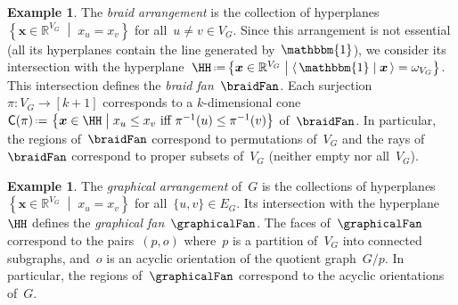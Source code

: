 \documentclass{amsart}
\theoremstyle{definition}
\newtheorem{example}[theorem]{Example}
\newcommand{\R}{\mathbb{R}} %
\renewcommand{\b}[1]{{\boldsymbol{#1}}} %
\newcommand{\set}[2]{\left\{ #1 \;\middle|\; #2 \right\}} %
\newcommand{\bigset}[2]{\big\{ #1 \;\big|\; #2 \big\}} %
\newcommand{\dotprod}[2]{\langle \, #1 \; | \; #2 \, \rangle} %
\newcommand{\one}{\mathbbm{1}} %
\newcommand{\eqdef}{\mbox{\,\raisebox{0.2ex}{\scriptsize\ensuremath{\mathrm:}}\ensuremath{=}\,}} %
\DeclareMathOperator{\cone}{cone} %
\newcommand{\darkblue}{\color{darkblue}} %
\newcommand{\defn}[1]{\textsl{\darkblue #1}} %
\newcommand{\primalCone}{\mathsf{C}^\star} %
\newcommand{\normalCone}{\mathsf{C}} %
\newcommand{\weight}{\omega} %
\begin{document}
\begin{example}
  \label{exm:braidFan}
  The \defn{braid arrangement} is the collection of hyperplanes~$\set{\b{x} \in \R^{V_G}}{x_u = x_v}$ for all~$u \ne v \in V_G$.
  Since this arrangement is not essential (all its hyperplanes contain the line generated by~$\one$), we consider its intersection with the hyperplane~$\HH \eqdef \bigset{\b{x} \in \R^{V_G}}{\dotprod{\one}{\b{x}} = \weight_{V_G}}$.
  This intersection defines the \defn{braid fan}~$\braidFan$.
  Each surjection~$\pi : V_G \to [k+1]$ corresponds to a $k$-dimensional cone~$\normalCone(\pi) \eqdef \set{\b{x} \in \HH}{x_u \le x_v \text{ iff } \pi^{-1}(u) \le \pi^{-1}(v)}$ of~$\braidFan$.
  In particular, the regions of~$\braidFan$ correspond to permutations of~$V_G$ and the rays of~$\braidFan$ correspond to proper subsets of~$V_G$ (neither empty nor all~$V_G$).
\end{example}

\begin{example}
  \label{exm:graphicalFan}
  The \defn{graphical arrangement} of~$G$ is the collections of hyperplanes~$\set{\b{x} \in \R^{V_G}}{x_u = x_v}$ for all~$\{u,v\} \in E_G$.
  Its intersection with the hyperplane~$\HH$ defines the \defn{graphical fan}~$\graphicalFan$.
  The faces of~$\graphicalFan$ correspond to the pairs~$(p,o)$ where~$p$ is a partition of~$V_G$ into connected subgraphs, and~$o$ is an acyclic orientation of the quotient graph~$G/p$.
  In particular, the regions of~$\graphicalFan$ correspond to the acyclic orientations of~$G$.
\end{example}
\end{document}
